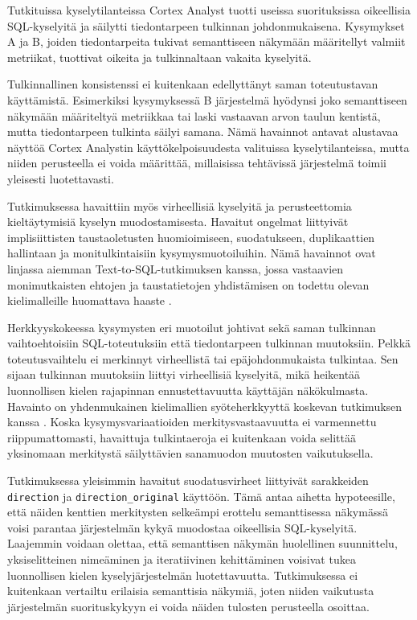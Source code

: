 Tutkituissa kyselytilanteissa Cortex Analyst tuotti useissa
suorituksissa oikeellisia SQL-kyselyitä ja säilytti tiedontarpeen
tulkinnan johdonmukaisena. Kysymykset A ja B, joiden tiedontarpeita
tukivat semanttiseen näkymään määritellyt valmiit metriikat,
tuottivat oikeita ja tulkinnaltaan vakaita kyselyitä.

Tulkinnallinen konsistenssi ei kuitenkaan edellyttänyt saman
toteutustavan käyttämistä. Esimerkiksi kysymyksessä B järjestelmä
hyödynsi joko semanttiseen näkymään määriteltyä metriikkaa tai laski
vastaavan arvon taulun kentistä, mutta tiedontarpeen tulkinta säilyi
samana. Nämä havainnot antavat alustavaa näyttöä Cortex Analystin
käyttökelpoisuudesta valituissa kyselytilanteissa, mutta niiden
perusteella ei voida määrittää, millaisissa tehtävissä järjestelmä
toimii yleisesti luotettavasti.

Tutkimuksessa havaittiin myös virheellisiä kyselyitä ja
perusteettomia kieltäytymisiä kyselyn muodostamisesta.
Havaitut ongelmat liittyivät implisiittisten taustaoletusten
huomioimiseen, suodatukseen, duplikaattien hallintaan ja
monitulkintaisiin kysymysmuotoiluihin. Nämä havainnot ovat linjassa aiemman
Text-to-SQL-tutkimuksen kanssa, jossa vastaavien monimutkaisten ehtojen
ja taustatietojen yhdistämisen on todettu olevan kielimalleille huomattava
haaste \cite{li2024bird,yu2018spider}.

Herkkyyskokeessa kysymysten eri
muotoilut johtivat sekä saman tulkinnan vaihtoehtoisiin SQL-toteutuksiin
että tiedontarpeen tulkinnan muutoksiin. Pelkkä toteutusvaihtelu ei
merkinnyt virheellistä tai epäjohdonmukaista tulkintaa. Sen sijaan
tulkinnan muutoksiin liittyi virheellisiä kyselyitä, mikä heikentää
luonnollisen kielen rajapinnan ennustettavuutta käyttäjän näkökulmasta.
Havainto on yhdenmukainen kielimallien syöteherkkyyttä koskevan
tutkimuksen kanssa \cite{chatterjee2024posix}. Koska kysymysvariaatioiden
merkitysvastaavuutta ei varmennettu riippumattomasti, havaittuja
tulkintaeroja ei kuitenkaan voida selittää yksinomaan merkitystä
säilyttävien sanamuodon muutosten vaikutuksella.

Tutkimuksessa yleisimmin havaitut suodatusvirheet liittyivät sarakkeiden
\\ \texttt{direction} ja \texttt{direction\_original} käyttöön. Tämä antaa
aihetta hypoteesille, että näiden kenttien merkitysten selkeämpi erottelu
semanttisessa näkymässä voisi parantaa järjestelmän kykyä muodostaa
oikeellisia SQL-kyselyitä. Laajemmin voidaan olettaa, että semanttisen
näkymän huolellinen suunnittelu, yksiselitteinen nimeäminen ja
iteratiivinen kehittäminen voisivat tukea luonnollisen kielen
kyselyjärjestelmän luotettavuutta. Tutkimuksessa ei kuitenkaan vertailtu
erilaisia semanttisia näkymiä, joten niiden vaikutusta järjestelmän
suorituskykyyn ei voida näiden tulosten perusteella osoittaa.

